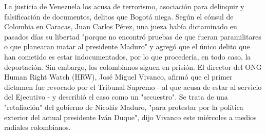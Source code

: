 \documentclass{article}%
\begin{document}
\newline%
%
La justicia de Venezuela los acusa de terrorismo, asociación para delinquir y falsificación de documentos, delitos que Bogotá niega.%
\newline%
%
Según el cónsul de Colombia en Caracas, Juan Carlos Pérez, una jueza había dictaminado en pasados días su libertad "porque no encontró pruebas de que fueran paramilitares o que planearan matar al presidente Maduro" y agregó que el único delito que han cometido es estar indocumentados, por lo que procedería, en todo caso, la deportación.\newline%
Sin embargo, los colombianos siguen en prisión.%
\newline%
%
El director del ONG Human Right Watch (HRW), José Miguel Vivanco, afirmó que el primer dictamen fue revocado por el Tribunal Supremo {-} al que acusa de estar al servicio del Ejecutivo {-}  y describió el caso como un "secuestro".%
\newline%
%
Se trata de una "retaliación" del gobierno de Nicolás Maduro, "para protestar por la política exterior del actual presidente Iván Duque", dijo Vivanco este miércoles a medios radiales colombianos.%
\newline%
%
\end{document}
